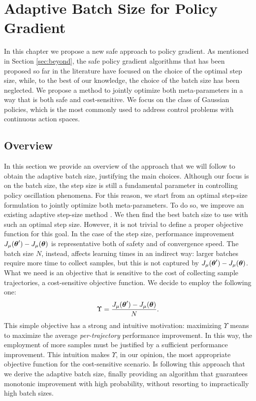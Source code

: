 \chapter{Adaptive Batch Size for Policy Gradient}\label{chap:main}
In this chapter we propose a new safe approach to policy gradient. As mentioned in Section \ref{sec:beyond}, the safe policy gradient algorithms that has been proposed so far in the literature have focused on the choice of the optimal step size, while, to the best of our knowledge, the choice of the batch size has been neglected. We propose a method to jointly optimize both meta-parameters in a way that is both safe and cost-sensitive. We focus on the class of Gaussian policies, which is the most commonly used to address control problems with continuous action spaces.



\section{Overview}
In this section we provide an overview of the approach that we will follow to obtain the adaptive batch size, justifying the main choices.
Although our focus is on the batch size, the step size is still a fundamental parameter in controlling policy oscillation phenomena. For this reason, we start from an optimal step-size formulation to jointly optimize both meta-parameters. To do so, we improve an existing adaptive step-size method \cite{NIPS2013_5186}. We then find the best batch size to use with such an optimal step size.
However, it is not trivial to define a proper objective function for this goal. In the case of the step size, performance improvement $J_{\mu}(\boldsymbol{\theta}') - J_{\mu}(\boldsymbol{\theta})$ is representative both of safety and of convergence speed. The batch size $N$, instead, affects learning times in an indirect way: larger batches require more time to collect samples, but this is not captured by $J_{\mu}(\boldsymbol{\theta}') - J_{\mu}(\boldsymbol{\theta})$. What we need is an objective that is sensitive to the cost of collecting sample trajectories, \ie a cost-sensitive objective function. We decide to employ the following one:
\[
	\Upsilon = \frac{J_{\mu}(\boldsymbol{\theta}') - J_{\mu}(\boldsymbol{\theta})}{N}.
\]
This simple objective has a strong and intuitive motivation: maximizing $\Upsilon$ means to maximize the average \textit{per-trajectory} performance improvement. In this way, the employment of more samples must be justified by a sufficient performance improvement. This intuition makes $\Upsilon$, in our opinion, the most appropriate objective function for the cost-sensitive scenario.
Is following this approach that we derive the adaptive batch size, finally providing an algorithm that guarantees monotonic improvement with high probability, without resorting to impractically high batch sizes.



